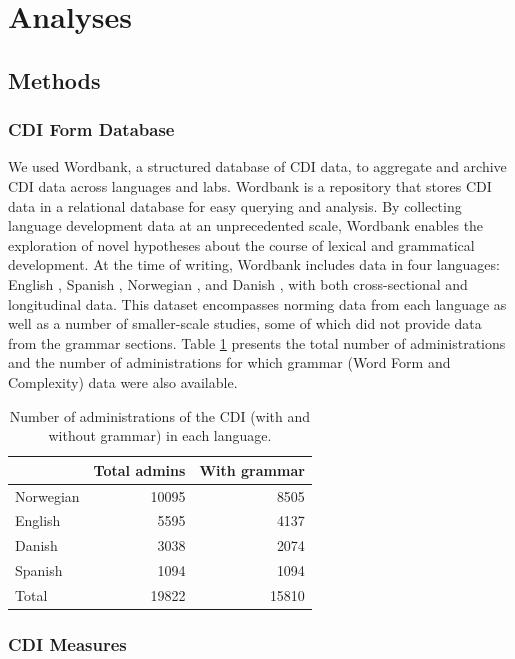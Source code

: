 \documentclass[10pt,letterpaper]{article}
\begin{document}
\section{Analyses}

\subsection{Methods}

\subsubsection{CDI Form Database}

We used Wordbank, a structured database of CDI data, to aggregate and archive CDI data across languages and labs. Wordbank is a repository that stores CDI data in a relational database for easy querying and analysis. By collecting language development data at an unprecedented scale, Wordbank enables the exploration of novel hypotheses about the course of lexical and grammatical development. At the time of writing, Wordbank includes data in four languages: English \cite{fenson2007}, Spanish \cite{jackson1993}, Norwegian \cite{simonsen2014}, and Danish \cite{bleses2008}, with both cross-sectional and longitudinal data. This dataset encompasses norming data from each language as well as a number of smaller-scale studies, some of which did not provide data from the grammar sections. Table \ref{table:num} presents the total number of administrations and the number of administrations for which grammar (Word Form and Complexity) data were also available.

\begin{table}
\begin{center}
\begin{tabular}{lrr}
\hline
& Total admins & With grammar\\ 
\hline
Norwegian & 10095 & 8505\\ 
English & 5595 & 4137\\ 
Danish & 3038 & 2074\\ 
Spanish & 1094 & 1094\\ 
\hline
Total & 19822 & 15810 \\
\hline
\end{tabular}
\end{center}
\caption{\label{table:num} Number of administrations of the CDI (with and without grammar) in each language.}
\end{table}

\subsubsection{CDI Measures}
\end{document}
